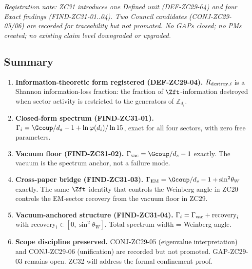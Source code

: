 \documentclass[12pt, a4paper]{article}
\begin{document}
\textit{Registration note: ZC31 introduces one Defined unit
(DEF-ZC29-04) and four Exact findings (FIND-ZC31-01..04).
Two Council candidates (CONJ-ZC29-05/06) are recorded for
traceability but not promoted. No GAPs closed; no PMs created;
no existing claim level downgraded or upgraded.}

\subsection{Summary}
\label{sec:summary}

\begin{enumerate}[leftmargin=*, label=\arabic*., noitemsep]

\item \textbf{Information-theoretic form registered
  (DEF-ZC29-04).}
$R_{{\rm destroy},i}$ is a Shannon information-loss fraction:
the fraction of $\Zft$-information destroyed when sector
activity is restricted to the generators of $\mathbb{Z}_{d_i}$.

\item \textbf{Closed-form spectrum (FIND-ZC31-01).}
$\Gamma_i = \Gcoup/d_s - 1 + \ln\varphi(d_i)/\ln 15$, exact
for all four sectors, with zero free parameters.

\item \textbf{Vacuum floor (FIND-ZC31-02).}
$\Gamma_{\rm vac} = \Gcoup/d_s - 1$ exactly. The vacuum is
the spectrum anchor, not a failure mode.

\item \textbf{Cross-paper bridge (FIND-ZC31-03).}
$\Gamma_{\rm EM} = \Gcoup/d_s - 1 + \sin^2\!\theta_W$ exactly.
The same $\Zft$ identity that controls the Weinberg angle
in ZC20 controls the EM-sector recovery from the vacuum
floor in ZC29.

\item \textbf{Vacuum-anchored structure (FIND-ZC31-04).}
$\Gamma_i = \Gamma_{\rm vac} + \text{recovery}_i$ with
recovery$_i \in [0, \sin^2\!\theta_W]$. Total spectrum
width = Weinberg angle.

\item \textbf{Scope discipline preserved.}
CONJ-ZC29-05 (eigenvalue interpretation) and CONJ-ZC29-06
(unification) are recorded but not promoted. GAP-ZC29-03
remains open. ZC32 will address the formal confinement
proof.

\end{enumerate}
\end{document}
